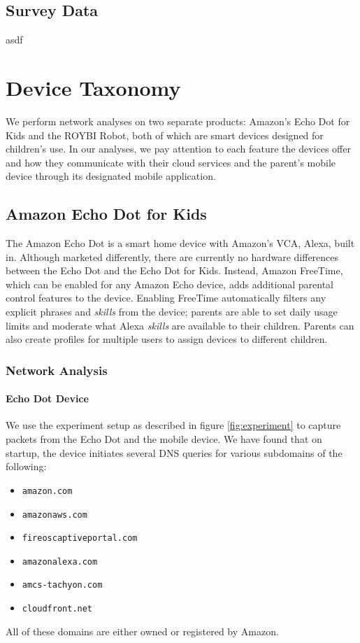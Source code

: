 \documentclass[12pt]{ucthesis}
\begin{document}
\section{Survey Data}
asdf

\chapter{Device Taxonomy}
\label{ch:taxonomy}
We perform network analyses on two separate products: Amazon's Echo Dot for Kids and the ROYBI Robot, both of which are smart devices designed for children's use. In our analyses, we pay attention to each feature the devices offer and how they communicate with their cloud services and the parent's mobile device through its designated mobile application.

\section{Amazon Echo Dot for Kids}
The Amazon Echo Dot is a smart home device with Amazon's VCA, Alexa, built in. Although marketed differently, there are currently no hardware differences between the Echo Dot and the Echo Dot for Kids. Instead, Amazon FreeTime, which can be enabled for any Amazon Echo device, adds additional parental control features to the device. Enabling FreeTime automatically filters any explicit phrases and \textit{skills} from the device; parents are able to set daily usage limits and moderate what Alexa \textit{skills} are available to their children. Parents can also create profiles for multiple users to assign devices to different children.

\subsection{Network Analysis}
\subsubsection{Echo Dot Device}
We use the experiment setup as described in figure \ref{fig:experiment} to capture packets from the Echo Dot and the mobile device. We have found that on startup, the device initiates several DNS queries for various subdomains of the following:
\begin{itemize} 
    \item \texttt{amazon.com}
    \item \texttt{amazonaws.com}
    \item \texttt{fireoscaptiveportal.com}
    \item \texttt{amazonalexa.com}
    \item \texttt{amcs-tachyon.com}
    \item \texttt{cloudfront.net}
\end{itemize}
All of these domains are either owned or registered by Amazon. 
\end{document}
